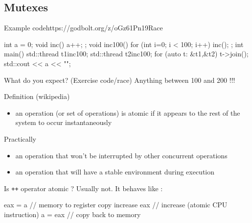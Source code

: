 \subsection[mutex]{Mutexes}

\begin{frame}[fragile]
  \begin{exampleblockGB}{Example code}{https://godbolt.org/z/oGz61Pn19}{Race}
    \begin{cppcode*}{}
      int a = 0;
      void inc() { a++; };
      void inc100() {
        for (int i=0; i < 100; i++) inc();
      };
      int main() {
        std::thread t1{inc100};
        std::thread t2{inc100};
        for (auto t: {&t1,&t2}) t->join();
        std::cout << a << "\n";
      }
    \end{cppcode*}
  \end{exampleblockGB}
  \pause
  \begin{block}{What do you expect? (Exercise code/race)}
    \pause
    Anything between 100 and 200 !!!
  \end{block}
\end{frame}

\begin{frame}[fragile]
  \begin{exampleblock}{Definition (wikipedia)}
    \begin{itemize}
    \item an operation (or set of operations) is atomic if it appears to the rest of the system to occur instantaneously
    \end{itemize}
  \end{exampleblock}
  \begin{block}{Practically}
    \begin{itemize}
    \item an operation that won't be interrupted by other concurrent operations
    \item an operation that will have a stable environment during execution
    \end{itemize}
  \end{block}
  \pause
  \begin{alertblock}{Is \texttt{++} operator atomic ?}
    \pause
    Usually not. It behaves like :
    \begin{cppcode*}{}
      eax = a       // memory to register copy
      increase eax  // increase (atomic CPU instruction)
      a = eax       // copy back to memory
    \end{cppcode*}
  \end{alertblock}
\end{frame}

